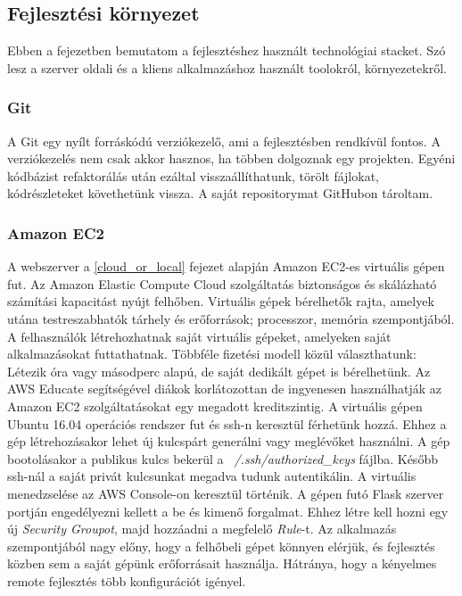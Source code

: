 \subsection{Fejlesztési környezet}

Ebben a fejezetben bemutatom a fejlesztéshez használt technológiai stacket. Szó lesz a szerver oldali és a kliens alkalmazáshoz használt toolokról, környezetekről.

\subsubsection{Git}

A Git egy nyílt forráskódú verziókezelő, ami a fejlesztésben rendkívül fontos. A verziókezelés nem csak akkor hasznos, ha többen dolgoznak egy projekten. Egyéni kódbázist
refaktorálás után ezáltal visszaállíthatunk, törölt fájlokat, kódrészleteket követhetünk vissza. A saját repositorymat GitHubon tároltam.

\subsubsection{Amazon EC2}

A webszerver a \ref{cloud_or_local} fejezet alapján Amazon EC2-es virtuális gépen fut. Az Amazon Elastic Compute Cloud szolgáltatás biztonságos és skálázható számítási kapacitást nyújt felhőben. Virtuális gépek bérelhetők rajta, amelyek utána testreszabhatók tárhely és erőforrások; processzor, memória szempontjából.
\newline
\newline
A felhasználók létrehozhatnak saját virtuális gépeket, amelyeken saját alkalmazásokat futtathatnak. Többféle fizetési modell közül választhatunk: Létezik óra vagy másodperc alapú, de saját dedikált gépet is bérelhetünk. Az AWS Educate segítségével diákok korlátozottan de ingyenesen használhatják az Amazon EC2 szolgáltatásokat egy megadott kreditszintig.
\newline
\newline
A virtuális gépen Ubuntu 16.04 operációs rendszer fut és ssh-n keresztül férhetünk hozzá. Ehhez a gép létrehozásakor lehet új kulcspárt generálni vagy meglévőket használni. A gép bootolásakor a publikus kulcs bekerül a \emph{~/.ssh/authorized\_keys} fájlba. Később ssh-nál a saját privát kulcsunkat megadva tudunk autentikálin. A virtuális menedzselése az AWS Console-on keresztül történik. A gépen futó Flask szerver portján engedélyezni kellett a be és kimenő forgalmat. Ehhez létre kell hozni egy új \emph{Security Groupot}, majd hozzáadni a megfelelő \emph{Rule}-t.
\newline
\newline
Az alkalmazás szempontjából nagy előny, hogy a felhőbeli gépet könnyen elérjük, és fejlesztés közben sem a saját gépünk erőforrásait használja. Hátránya, hogy a kényelmes remote fejlesztés több konfigurációt igényel.

